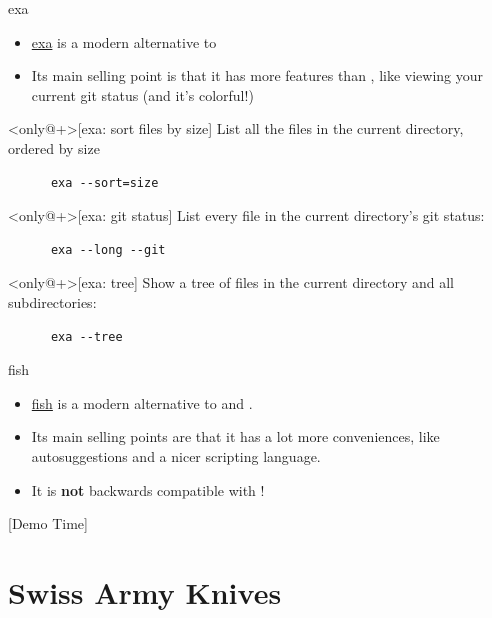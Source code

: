 \begin{frame}[fragile]{exa}
  \begin{itemize}
    \item \href{https://github.com/ogham/exa}{exa} is a modern alternative to
    \item Its main selling point is that it has more features than ,
      like viewing your current git status (and it's colorful!)
  \end{itemize}
  \pause
  \vfill
  \begin{example}<only@+>[exa: sort files by size]
    List all the files in the current directory, ordered by size
    \begin{verbatim}
      exa --sort=size
    \end{verbatim}
  \end{example}
  \begin{example}<only@+>[exa: git status]
    List every file in the current directory's git status:
    \begin{verbatim}
      exa --long --git
    \end{verbatim}
  \end{example}
  \begin{example}<only@+>[exa: tree]
    Show a tree of files in the current directory and all subdirectories:
    \begin{verbatim}
      exa --tree
    \end{verbatim}
  \end{example}
\end{frame}

\begin{frame}[fragile]{fish}
  \begin{itemize}
    \item \href{https://fishshell.com/}{fish} is a modern alternative to
       and .
    \item Its main selling points are that it has a lot more conveniences, like autosuggestions and a nicer scripting language.
      \pause
    \item It is \textbf{not} backwards compatible with !
  \end{itemize}
  \pause
  \vfill
  \begin{center}
    [Demo Time]
  \end{center}
\end{frame}

\section{Swiss Army Knives}

